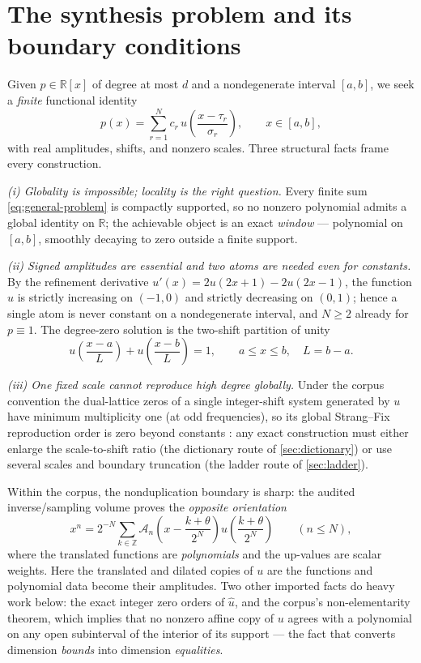\documentclass[11pt,oneside]{article}
\numberwithin{equation}{section}
\theoremstyle{definition}
\theoremstyle{remark}
\newcommand{\R}{\mathbb R}
\newcommand{\Z}{\mathbb Z}
\newcommand{\Gd}{\mathcal A}
\begin{document}
\section{The synthesis problem and its boundary conditions}
\label{sec:problem}

Given $p\in\R[x]$ of degree at most $d$ and a nondegenerate interval
$[a,b]$, we seek a \emph{finite} functional identity
\begin{equation}
 p(x)=\sum_{r=1}^{N}c_r\,
 u\!\left(\frac{x-\tau_r}{\sigma_r}\right),
 \qquad x\in[a,b],
 \label{eq:general-problem}
\end{equation}
with real amplitudes, shifts, and nonzero scales.  Three structural
facts frame every construction.

\emph{(i) Globality is impossible; locality is the right question.}
Every finite sum \eqref{eq:general-problem} is compactly supported,
so no nonzero polynomial admits a global identity on $\R$; the
achievable object is an exact \emph{window} --- polynomial on
$[a,b]$, smoothly decaying to zero outside a finite support.

\emph{(ii) Signed amplitudes are essential and two atoms are needed
even for constants.}  By the refinement derivative
$u'(x)=2u(2x+1)-2u(2x-1)$, the function $u$ is strictly increasing on
$(-1,0)$ and strictly decreasing on $(0,1)$; hence a single atom is
never constant on a nondegenerate interval, and $N\ge2$ already for
$p\equiv1$.  The degree-zero solution is the two-shift partition of
unity
\begin{equation}
 u\!\left(\frac{x-a}{L}\right)
 +u\!\left(\frac{x-b}{L}\right)=1,
 \qquad a\le x\le b,\quad L=b-a.
 \label{eq:partition-interval}
\end{equation}

\emph{(iii) One fixed scale cannot reproduce high degree globally.}
Under the corpus convention the dual-lattice zeros of a single
integer-shift system generated by $u$ have minimum multiplicity one
(at odd frequencies), so its global Strang--Fix reproduction order is
zero beyond constants \cite{StrangFix1973,deBoorRon1992}: any exact
construction must either enlarge the scale-to-shift ratio (the
dictionary route of \cref{sec:dictionary}) or use several scales and
boundary truncation (the ladder route of \cref{sec:ladder}).

Within the corpus, the nonduplication boundary is sharp: the audited
inverse/sampling volume proves the \emph{opposite orientation}
\begin{equation}
 x^{n}=2^{-N}\sum_{k\in\Z}
 \Gd_n\!\left(x-\frac{k+\theta}{2^{N}}\right)
 u\!\left(\frac{k+\theta}{2^{N}}\right)
 \qquad(n\le N),
 \label{eq:opposite-orientation}
\end{equation}
where the translated functions are \emph{polynomials} and the
up-values are scalar weights.  Here the translated and dilated copies
of $u$ are the functions and polynomial data become their amplitudes.
Two other imported facts do heavy work below: the exact integer zero
orders of $\widehat u$, and the corpus's non-elementarity theorem,
which implies that no nonzero affine copy of $u$ agrees with a
polynomial on any open subinterval of the interior of its support ---
the fact that converts dimension \emph{bounds} into dimension
\emph{equalities}.
\end{document}
